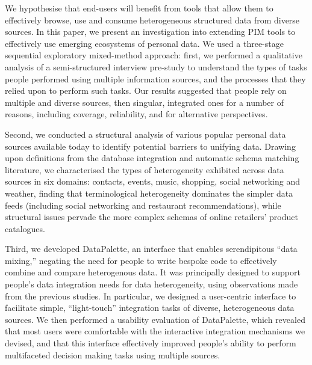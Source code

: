 \documentclass{sigchi}
\begin{document}
We hypothesise that end-users will benefit from tools that allow them to effectively browse, use and consume heterogeneous structured data from diverse sources. In this paper, we present an investigation into extending PIM tools to effectively use emerging ecosystems of personal data.  We used a three-stage sequential exploratory mixed-method approach: first, we performed a qualitative analysis of a semi-structured interview pre-study to understand the types of tasks people performed using multiple information sources, and the processes that they relied upon to perform such tasks.  Our results suggested that people rely on multiple and diverse sources, then singular, integrated ones for a number of reasons, including coverage, reliability, and for alternative perspectives.  


Second, we conducted a structural analysis of various popular personal data sources available today to identify potential barriers to unifying data.  Drawing upon definitions from the database integration and automatic schema matching literature, we characterised the types of heterogeneity exhibited across data sources in six domains: contacts, events, music, shopping, social networking and weather, finding that terminological heterogeneity dominates the simpler data feeds (including social networking and restaurant recommendations), while structural issues pervade the more complex schemas of online retailers' product catalogues.


Third, we developed DataPalette, an interface that enables serendipitous ``data mixing,'' negating the need for people to write bespoke code to effectively combine and compare heterogenous data.  It was principally designed to support people's data integration needs for data heterogeneity, using observations made from the previous studies.  In particular, we designed a user-centric interface to facilitate simple, ``light-touch'' integration tasks of diverse, heterogeneous data sources.  We then performed a usability evaluation of DataPalette, which revealed that most users were comfortable with the interactive integration mechanisms we devised, and that this interface effectively improved people's ability to perform multifaceted decision making tasks using multiple sources.
\end{document}
